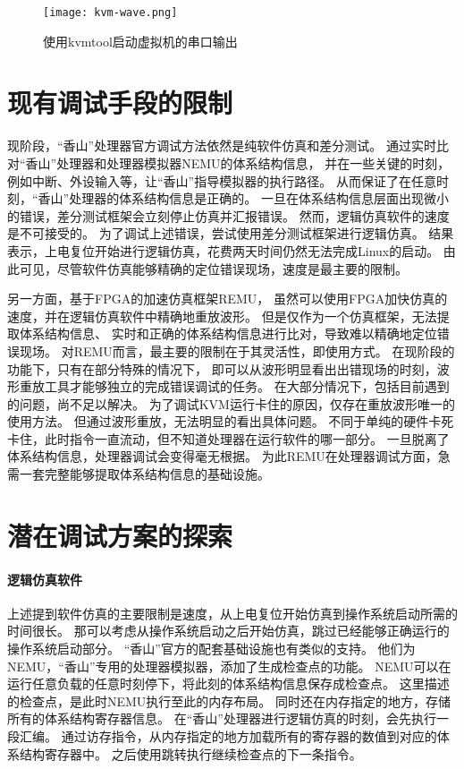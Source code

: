 \begin{figure}[htbp]
    \centering
    \texttt{[image: kvm-wave.png]}
    \caption{使用kvmtool启动虚拟机的串口输出}
    \label{fig:kvm-wave}
\end{figure}

\section{现有调试手段的限制}
现阶段，“香山”处理器官方调试方法依然是纯软件仿真和差分测试。
通过实时比对“香山”处理器和处理器模拟器NEMU的体系结构信息，
并在一些关键的时刻，例如中断、外设输入等，让“香山”指导模拟器的执行路径。
从而保证了在任意时刻，“香山”处理器的体系结构信息是正确的。
一旦在体系结构信息层面出现微小的错误，差分测试框架会立刻停止仿真并汇报错误。
然而，逻辑仿真软件的速度是不可接受的。
为了调试上述错误，尝试使用差分测试框架进行逻辑仿真。
结果表示，上电复位开始进行逻辑仿真，花费两天时间仍然无法完成Linux的启动。
由此可见，尽管软件仿真能够精确的定位错误现场，速度是最主要的限制。

另一方面，基于FPGA的加速仿真框架REMU，
虽然可以使用FPGA加快仿真的速度，并在逻辑仿真软件中精确地重放波形。
但是仅作为一个仿真框架，无法提取体系结构信息、
实时和正确的体系结构信息进行比对，导致难以精确地定位错误现场。
对REMU而言，最主要的限制在于其灵活性，即使用方式。
在现阶段的功能下，只有在部分特殊的情况下，
即可以从波形明显看出出错现场的时刻，波形重放工具才能够独立的完成错误调试的任务。
在大部分情况下，包括目前遇到的问题，尚不足以解决。
为了调试KVM运行卡住的原因，仅存在重放波形唯一的使用方法。
但通过波形重放，无法明显的看出具体问题。
不同于单纯的硬件卡死卡住，此时指令一直流动，但不知道处理器在运行软件的哪一部分。
一旦脱离了体系结构信息，处理器调试会变得毫无根据。
为此REMU在处理器调试方面，急需一套完整能够提取体系结构信息的基础设施。

\section{潜在调试方案的探索}

\paragraph{逻辑仿真软件}
上述提到软件仿真的主要限制是速度，从上电复位开始仿真到操作系统启动所需的时间很长。
那可以考虑从操作系统启动之后开始仿真，跳过已经能够正确运行的操作系统启动部分。
“香山”官方的配套基础设施也有类似的支持。
他们为NEMU，“香山”专用的处理器模拟器，添加了生成检查点的功能。
NEMU可以在运行任意负载的任意时刻停下，将此刻的体系结构信息保存成检查点。
这里描述的检查点，是此时NEMU执行至此的内存布局。
同时还在内存指定的地方，存储所有的体系结构寄存器信息。
在“香山”处理器进行逻辑仿真的时刻，会先执行一段汇编。
通过访存指令，从内存指定的地方加载所有的寄存器的数值到对应的体系结构寄存器中。
之后使用跳转执行继续检查点的下一条指令。

